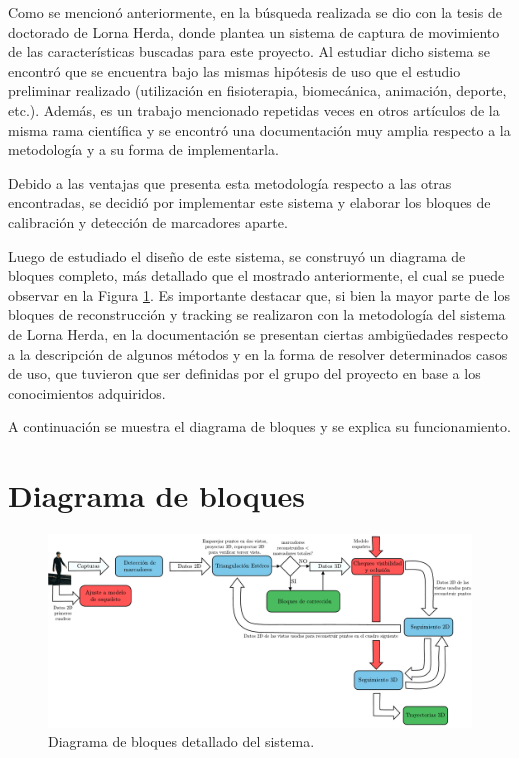 Como se mencionó anteriormente, en la búsqueda realizada se dio con la tesis de doctorado de Lorna Herda\cite{herda}, donde plantea un sistema de captura de movimiento de las características buscadas para este proyecto. Al estudiar dicho sistema se encontró que se encuentra bajo las mismas hipótesis de uso que el estudio preliminar realizado (utilización en fisioterapia, biomecánica, animación, deporte, etc.). Además, es un trabajo mencionado repetidas veces en otros artículos de la misma rama científica y se encontró una documentación muy amplia respecto a la metodología y a su forma de implementarla.

Debido a las ventajas que presenta esta metodología respecto a las otras encontradas, se decidió por implementar este sistema y elaborar los bloques de calibración y detección de marcadores aparte.

Luego de estudiado el diseño de este sistema, se construyó un diagrama de bloques completo, más detallado que el mostrado anteriormente, el cual se puede observar en la Figura \ref{diagBloq}. Es importante destacar que, si bien la mayor parte de los bloques de reconstrucción y tracking se realizaron con la metodología del sistema de Lorna Herda\cite{herda}, en la documentación se presentan ciertas ambigüedades respecto a la descripción de algunos métodos y en la forma de resolver determinados casos de uso, que tuvieron que ser definidas por el grupo del proyecto en base a los conocimientos adquiridos.

A continuación se muestra el diagrama de bloques y se explica su funcionamiento.

\section{Diagrama de bloques}

\vspace{-1cm}
\begin{figure}[ht!]
\hspace{-1cm}
\includegraphics[scale=0.55]{img/Sistema_completo/Diagramadebloques_Herda.pdf}
\vspace{-1cm}
\caption{Diagrama de bloques detallado del sistema.}
\label{diagBloq}
\end{figure}

